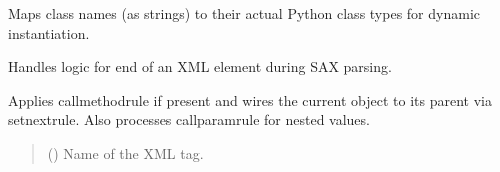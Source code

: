 \documentclass[letterpaper,10pt,english]{sphinxmanual}
\begin{document}
\begin{fulllineitems}
\begin{fulllineitems}
\label{\detokenize{apache_commons_validator_python.util:apache_commons_validator_python.util.digester.Digester.class_mapping}}
\pysigstartsignatures
{}
\pysigstopsignatures
\sphinxAtStartPar
Maps class names (as strings) to their actual Python class types for dynamic instantiation.

\end{fulllineitems}


\begin{fulllineitems}
\label{\detokenize{apache_commons_validator_python.util:apache_commons_validator_python.util.digester.Digester.endElement}}
\pysigstartsignatures
{}
\pysigstopsignatures
\sphinxAtStartPar
Handles logic for end of an XML element during SAX parsing.

\sphinxAtStartPar
Applies call\sphinxhyphen{}method\sphinxhyphen{}rule if present and wires the current object to its parent
via set\sphinxhyphen{}next\sphinxhyphen{}rule. Also processes call\sphinxhyphen{}param\sphinxhyphen{}rule for nested values.
\begin{quote}\begin{description}
\sphinxAtStartPar
{} () \textendash{} Name of the XML tag.

\end{description}\end{quote}

\end{fulllineitems}



\end{fulllineitems}
\end{document}
